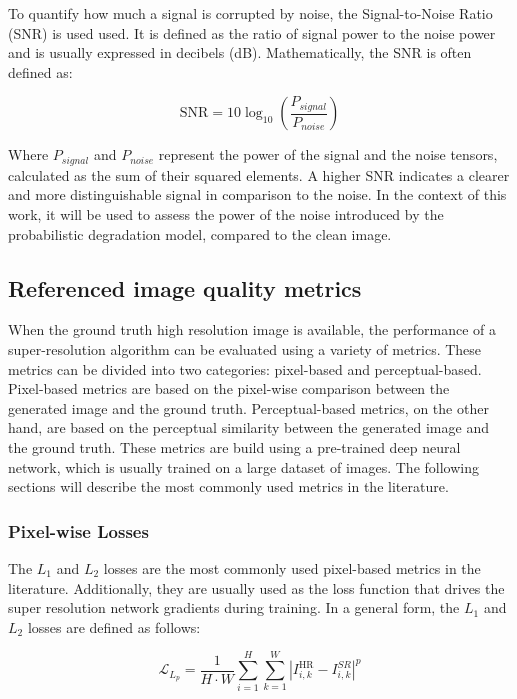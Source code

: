         To quantify how much a signal is corrupted by noise, the Signal-to-Noise Ratio (SNR) is used used. It is defined as the ratio of signal power to the noise power and is usually expressed in decibels (dB). Mathematically, the SNR is often defined as:

        \[ \text{SNR} = 10 \log_{10} \left( \frac{P_{signal}}{P_{noise}} \right) \]

        Where $P_{signal}$ and $P_{noise}$ represent the power of the signal and the noise tensors, calculated as the sum of their squared elements.
        A higher SNR indicates a clearer and more distinguishable signal in comparison to the noise. In the context of this work, it will be used to assess the power of the noise introduced by the probabilistic degradation model, compared to the clean image.

    \subsection{Referenced image quality metrics}

        When the ground truth high resolution image is available, the performance of a super-resolution algorithm can be evaluated using a variety of metrics. 
        These metrics can be divided into two categories: pixel-based and perceptual-based.
        Pixel-based metrics are based on the pixel-wise comparison between the generated image and the ground truth. 
        Perceptual-based metrics, on the other hand, are based on the perceptual similarity between the generated image and the ground truth. 
        These metrics are build using a pre-trained deep neural network, which is usually trained on a large dataset of images.
        The following sections will describe the most commonly used metrics in the literature.

        \subsubsection{Pixel-wise Losses}

            The $L_1$ and $L_2$ losses are the most commonly used pixel-based metrics in the literature. 
            Additionally, they are usually used as the loss function that drives the super resolution network gradients during training. 
            In a general form, the $L_1$ and $L_2$ losses are defined as follows:

            \begin{equation}
                \mathcal{L}_{L_p} = \frac{1}{H \cdot W} \sum_{i=1}^{H} \sum_{k=1}^{W} |I^{\text{HR}}_{i,k} - I^{SR}_{i,k}|^p
            \end{equation}

